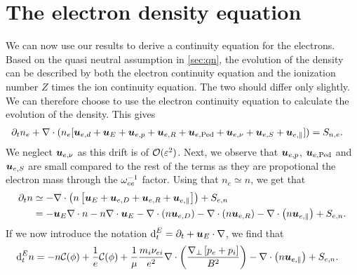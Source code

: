 \section{The electron density equation}
%
We can now use our results to derive a continuity equation for the electrons.
Based on the quasi neutral assumption in \cref{sec:qn}, the evolution of the density can be described by both the electron continuity equation and the ionization number $Z$ times the ion continuity equation.
The two should differ only slightly.
We can therefore choose to use the electron continuity equation to calculate the evolution of the density.
This gives
%
\begin{align}
    \partial_t n_e + \nabla\cdot (n_e [
 \boldsymbol{u}_{e,d} + \boldsymbol{u}_E + \boldsymbol{u}_{e,p} + \boldsymbol{u}_{e,R}
 + \boldsymbol{u}_{e,\text{Ped}}
 + \boldsymbol{u}_{e,\nu}
 + \boldsymbol{u}_{e,S} + \boldsymbol{u}_{e,\|}
 ]) &= S_{n, e}.
 \label{eq:el_cont}
\end{align}
%
We neglect $\boldsymbol{u}_{e,\nu}$ as this drift is of $\mathcal{O}(\varepsilon^2)$.
Next, we observe that $\boldsymbol{u}_{e,p}$, $\boldsymbol{u}_{e,\text{Ped}}$ and $\boldsymbol{u}_{e,S}$ are small compared to the rest of the terms as they are propotional the electron mass through the $\omega_{ce}^{-1}$ factor.
Using that $n_e\simeq n$, we get that
%
\begin{align*}
    \partial_t n &\simeq - \div\L(n\L[\ve{u}_E + \ve{u}_{e,D} + \ve{u}_{e,R} + \ve{u}_{e,\|}\R]\R) + S_{e,n}
    \\
%
    &=
    - \ve{u}_E\nabla\cdot n
    - n\div\ve{u}_E
    - \div\L(n \ve{u}_{e,D}\R)
    - \div\L(n \ve{u}_{e,R}\R)
    - \div\L(n \ve{u}_{e,\|}\R)
    + S_{e,n}.
\end{align*}
%
If we now introduce the notation $\text{d}_t^E = \partial_t + \boldsymbol{u}_E\cdot\nabla$, we find that
%
\begin{align}
    \text{d}_t^E n
    &=
    - n\mathcal{C}(\phi)
    + \frac{1}{e}\mathcal{C}(\phi)
    +\frac{1}{\mu}\frac{m_i\nu_{ei}}{e^2}
    \nabla\cdot\left( \frac{\nabla_\perp \left[p_e + p_i\right]}{B^2} \right)
    - \nabla\cdot\left(n \boldsymbol{u}_{e,\|}\right)
    + S_{e,n}.
    \label{eq:dens_evol_gen}
\end{align}

